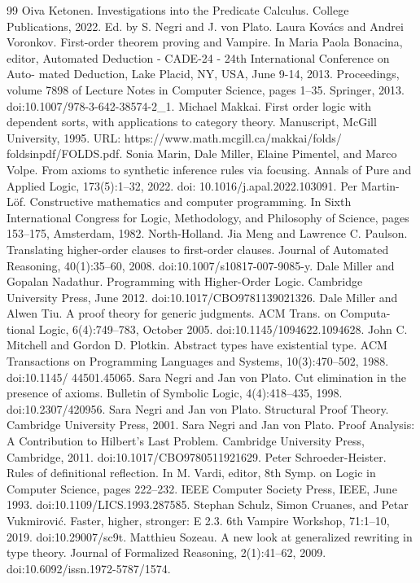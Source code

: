 \documentclass[10pt,a4paper]{article}
\begin{document}
\begin{thebibliography}{99}
 Oiva Ketonen. Investigations into the Predicate Calculus. College Publications, 2022. Ed. by S. Negri and J. von Plato.
 Laura Kovács and Andrei Voronkov. First-order theorem proving and Vampire. In Maria Paola Bonacina, editor, Automated Deduction - CADE-24 - 24th International Conference on Auto- mated Deduction, Lake Placid, NY, USA, June 9-14, 2013. Proceedings, volume 7898 of Lecture Notes in Computer Science, pages 1–35. Springer, 2013. doi:10.1007/978-3-642-38574-2\_1.
 Michael Makkai. First order logic with dependent sorts, with applications to category theory. Manuscript, McGill University, 1995. URL: https://www.math.mcgill.ca/makkai/folds/ foldsinpdf/FOLDS.pdf.
 Sonia Marin, Dale Miller, Elaine Pimentel, and Marco Volpe. From axioms to synthetic inference rules via focusing. Annals of Pure and Applied Logic, 173(5):1–32, 2022. doi: 10.1016/j.apal.2022.103091.
 Per Martin-Löf. Constructive mathematics and computer programming. In Sixth International Congress for Logic, Methodology, and Philosophy of Science, pages 153–175, Amsterdam, 1982. North-Holland.
 Jia Meng and Lawrence C. Paulson. Translating higher-order clauses to first-order clauses. Journal of Automated Reasoning, 40(1):35–60, 2008. doi:10.1007/s10817-007-9085-y.
 Dale Miller and Gopalan Nadathur. Programming with Higher-Order Logic. Cambridge University Press, June 2012. doi:10.1017/CBO9781139021326.
 Dale Miller and Alwen Tiu. A proof theory for generic judgments. ACM Trans. on Computa- tional Logic, 6(4):749–783, October 2005. doi:10.1145/1094622.1094628.
 John C. Mitchell and Gordon D. Plotkin. Abstract types have existential type. ACM Transactions on Programming Languages and Systems, 10(3):470–502, 1988. doi:10.1145/ 44501.45065.
 Sara Negri and Jan von Plato. Cut elimination in the presence of axioms. Bulletin of Symbolic Logic, 4(4):418–435, 1998. doi:10.2307/420956.
 Sara Negri and Jan von Plato. Structural Proof Theory. Cambridge University Press, 2001.
 Sara Negri and Jan von Plato. Proof Analysis: A Contribution to Hilbert’s Last Problem. Cambridge University Press, Cambridge, 2011. doi:10.1017/CBO9780511921629.
 Peter Schroeder-Heister. Rules of definitional reflection. In M. Vardi, editor, 8th Symp. on Logic in Computer Science, pages 222–232. IEEE Computer Society Press, IEEE, June 1993. doi:10.1109/LICS.1993.287585.
 Stephan Schulz, Simon Cruanes, and Petar Vukmirović. Faster, higher, stronger: E 2.3. 6th Vampire Workshop, 71:1–10, 2019. doi:10.29007/sc9t.
 Matthieu Sozeau. A new look at generalized rewriting in type theory. Journal of Formalized Reasoning, 2(1):41–62, 2009. doi:10.6092/issn.1972-5787/1574.
\end{thebibliography}
\end{document}
